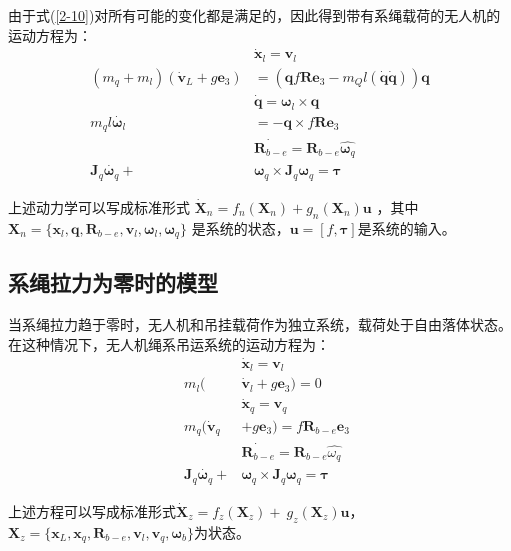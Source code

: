 \documentclass[lang=chs, degree=master, blindreview=false, winfonts=true]{yanputhesis}
\begin{document}
由于式(\ref{2-10})对所有可能的变化都是满足的，因此得到带有系绳载荷的无人机的运动方程为：
\begin{equation}
	\begin{aligned}
		&\dot{\bm x}_{l}=\bm v_{l} \\
		(m_q+m_l)(\dot{\bm v}_L+g\bm e_3)& =(\bm q f\bm R\bm e_3-m_Ql(\dot{\bm q}\dot{\bm q}))\bm q \\
		&\dot{\bm q}=\bm \omega_l\times \bm q \\
		m_{q}l \dot{\bm \omega_l}&=-\bm q\times f\bm R\bm e_{3} \\
		&\dot{\bm R_{b-e}}=\bm R_{b-e}\hat{\bm  \omega_q} \\
		\bm J_{q}\dot{\bm  \omega_q}+&\bm  \omega_q\times \bm J_{q}\bm  \omega_q=\bm \tau
	\end{aligned}
\end{equation}

上述动力学可以写成标准形式 $\dot{\bm X}_n= f_n(\bm X_n)+g_n(\bm X_n)\bm u$ ，其中 $\bm X_n = \{\bm x_l,\bm q,\bm R_{b-e},\bm v_l,\bm \omega_l,\bm \omega_q\}$ 是系统的状态，$\bm u = \left[f,\bm \tau \right]$是系统的输入。
\subsection{系绳拉力为零时的模型}
当系绳拉力趋于零时，无人机和吊挂载荷作为独立系统，载荷处于自由落体状态。在这种情况下，无人机绳系吊运系统的运动方程为：
\begin{equation}
	\begin{aligned}
	&\dot{\bm x}_{l}=\bm v_{l}\\
	\quad m_{l}(&\dot{\bm v}_{l}+g\bm e_{3})=0\\
	&\dot{\bm x}_{q}=\bm v_{q}\\
	\quad m_{q}(\dot{\bm v}_{q}&+g\bm e_{3})=f\bm R_{b-e}\bm e_{3}\\
	&\dot{\bm R_{b-e}}=\bm R_{b-e}\hat{\omega_q}\\
	\quad \bm J_{q}\dot{\bm \omega_q}+&\bm \omega_q \times \bm J_{q}\bm \omega_q=\bm \tau
\end{aligned}
\end{equation}

上述方程可以写成标准形式$\dot{\bm X}_z=f_z(\bm X_z)+\ g_z(\bm X_z)\bm u$，$\bm X_z = \{\bm x_L,\bm x_q,\bm R_{b-e},\bm v_l,\bm v_q,\bm \omega_b\}$为状态。
\end{document}
